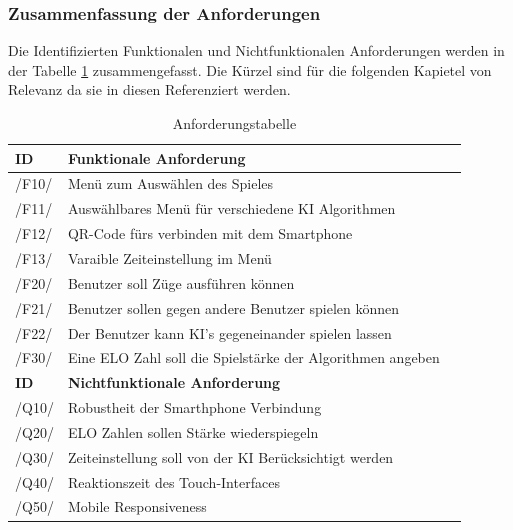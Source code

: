 \documentclass[12pt,a4paper,bibliography=totocnumbered,listof=totocnumbered]{article}
\begin{document}
\begin{appendix}
\subsubsection{Zusammenfassung der Anforderungen}
Die Identifizierten Funktionalen und Nichtfunktionalen Anforderungen werden in der Tabelle \ref{tab:Anforderungen} zusammengefasst. 
Die Kürzel sind für die folgenden Kapietel von Relevanz da sie in diesen Referenziert werden.
\vspace{1em}
\begin{table}[!h]
	\centering
	\begin{tabular}{|l|l|l|}
		\hline
		\textbf{ID} & \textbf{Funktionale Anforderung}\\
		\hline
		/F10/ & Menü zum Auswählen des Spieles \\
		\hline
		/F11/ & Auswählbares Menü für verschiedene KI Algorithmen \\
		\hline
        /F12/ & QR-Code fürs verbinden mit dem Smartphone \\
		\hline
		/F13/ & Varaible Zeiteinstellung im Menü \\
        \hline
		/F20/ & Benutzer soll Züge ausführen können \\
        \hline
		/F21/ & Benutzer sollen gegen andere Benutzer spielen können \\
        \hline
		/F22/ & Der Benutzer kann KI's gegeneinander spielen lassen \\
        \hline
		/F30/ & Eine ELO Zahl soll die Spielstärke der Algorithmen angeben \\
	
		\hline
		\textbf{ID} & \textbf{Nichtfunktionale Anforderung}\\
		\hline
		/Q10/ & Robustheit der Smarthphone Verbindung \\
        \hline
		/Q20/ & ELO Zahlen sollen Stärke wiederspiegeln \\
        \hline
		/Q30/ & Zeiteinstellung soll von der KI Berücksichtigt werden \\
        \hline
		/Q40/ & Reaktionszeit des Touch-Interfaces \\
        \hline
		/Q50/ & Mobile Responsiveness \\
		\hline
	\end{tabular}
	\caption{Anforderungstabelle}
	\label{tab:Anforderungen}
\end{table}

\pagebreak


\end{appendix}
\end{document}
